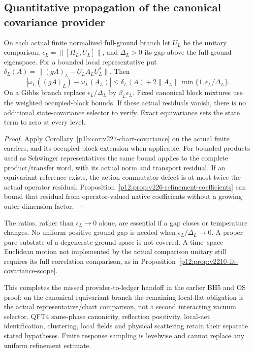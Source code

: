 \documentclass[12pt,a4paper]{article}
\begin{document}
\subsection{Quantitative propagation of the canonical covariance provider}
\label{p12:sec:v227-covariance-provider}
\begin{corollary}
\label{p12:cor:v227-covariance-provider}
On each actual finite normalized full-ground branch let $U_L$ be the
unitary comparison, $\epsilon_L=\|[H_L,U_L]\|$, and $\Delta_L>0$ its
gap above the full ground eigenspace. For a bounded local representative put
$\delta_L(A)=\|(gA)_L-U_LA_LU_L^*\|$. Then
\[
 |\omega_L((gA)_L)-\omega_L(A_L)|
 \le\delta_L(A)+2\|A_L\|
             \min\{1,\epsilon_L/\Delta_L\}.
\]
On a Gibbs branch replace $\epsilon_L/\Delta_L$ by
$\beta_L\epsilon_L$. Fixed canonical block mixtures use the weighted
occupied-block bounds. If these actual residuals vanish, there is no
additional state-covariance selector to verify. Exact equivariance sets
the state term to zero at every level.
\end{corollary}
\begin{proof}
Apply Corollary~\ref{p1b:cor:v227-chart-covariance} on the actual
finite carriers, and its occupied-block extension when applicable.
For bounded products used as Schwinger representatives the same bound
applies to the complete product/transfer word, with its actual norm and
transport residual. If an equivariant reference exists, the action
commutator defect is at most twice the actual operator residual.
Proposition~\ref{p12:prop:v226-refinement-coefficients} can bound that
residual from operator-valued native coefficients without a growing outer
dimension factor.
\end{proof}
The ratios, rather than $\epsilon_L\to0$ alone, are essential if a gap
closes or temperature changes. No uniform positive ground gap is needed
when $\epsilon_L/\Delta_L\to0$. A proper pure substate of a degenerate
ground space is not covered. A time--space Euclidean motion not implemented
by the actual comparison unitary still requires its full correlation
comparison, as in Proposition~\ref{p12:prop:v2210-lit-covariance-scope}.

This completes the missed provider-to-ledger handoff in the earlier BH5
and OS proof: on the canonical equivariant branch the remaining local-flat
obligation is the actual representative/chart comparison, not a second
interacting vacuum selector. QFT4 same-phase canonicity, reflection
positivity, local-net identification, clustering, local fields and physical
scattering retain their separate stated hypotheses. Finite response sampling
is levelwise and cannot replace any uniform refinement estimate.
\end{document}
